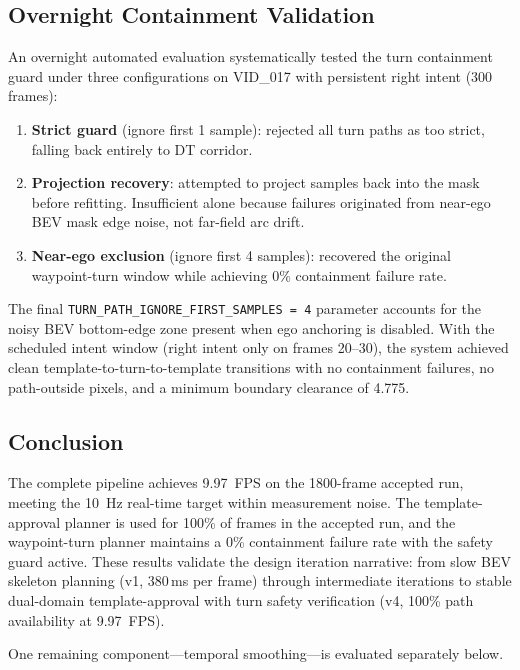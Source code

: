 \documentclass[12pt,letterpaper,oneside]{report}
\begin{document}
\subsection{Overnight Containment Validation}
\label{sec:overnight_eval}

An overnight automated evaluation systematically tested the turn containment guard under three configurations on VID\_017 with persistent right intent (300 frames):

\begin{enumerate}[nosep]
  \item \textbf{Strict guard} (ignore first 1 sample): rejected all turn paths as too strict, falling back entirely to DT corridor.
  \item \textbf{Projection recovery}: attempted to project samples back into the mask before refitting.  Insufficient alone because failures originated from near-ego BEV mask edge noise, not far-field arc drift.
  \item \textbf{Near-ego exclusion} (ignore first 4 samples): recovered the original waypoint-turn window while achieving 0\% containment failure rate.
\end{enumerate}

The final \texttt{TURN\_PATH\_IGNORE\_FIRST\_SAMPLES\,=\,4} parameter accounts for the noisy BEV bottom-edge zone present when ego anchoring is disabled.  With the scheduled intent window (right intent only on frames 20--30), the system achieved clean template-to-turn-to-template transitions with no containment failures, no path-outside pixels, and a minimum boundary clearance of \SI{4.775}{\px}.


\subsection{Conclusion}

The complete pipeline achieves 9.97~FPS on the 1800-frame accepted run, meeting the 10~Hz real-time target within measurement noise.  The template-approval planner is used for 100\% of frames in the accepted run, and the waypoint-turn planner maintains a 0\% containment failure rate with the safety guard active.  These results validate the design iteration narrative: from slow BEV skeleton planning (v1, 380\,ms per frame) through intermediate iterations to stable dual-domain template-approval with turn safety verification (v4, 100\% path availability at 9.97~FPS).

One remaining component---temporal smoothing---is evaluated separately below.
\end{document}
